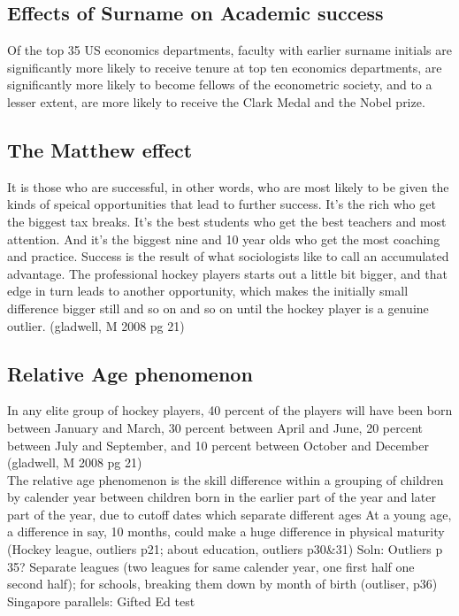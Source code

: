 \documentclass[11pt]{article}
\begin{document}
\subsection{Effects of Surname on Academic success}
Of the top 35 US economics departments, faculty with earlier surname initials are significantly more likely to receive tenure at top ten economics departments, are significantly more likely to become fellows of the econometric society, and to a lesser extent, are more likely to receive the Clark Medal and the Nobel prize.
\subsection{The Matthew effect}
It is those who are successful, in other words, who are most likely to be given the kinds of speical opportunities that lead to further success. It's the rich who get the biggest tax breaks. It's the best students who get the best teachers and most attention. And it's the biggest nine and 10 year olds who get the most coaching and practice. Success is the result of what sociologists like to call an accumulated advantage. The professional hockey players starts out a little bit bigger, and that edge in turn leads to another opportunity, which makes the initially small difference bigger still and so on and so on until the hockey player is a genuine outlier. (gladwell, M 2008 pg 21)

\subsection{Relative Age phenomenon}
In any elite group of hockey players, 40 percent of the players will have been born between January and March, 30 percent between April and June, 20 percent between July and September, and 10 percent between October and December (gladwell, M 2008 pg 21)
\\The relative age phenomenon is the skill difference within a grouping of children by calender year between children born in the earlier part of the year and later part of the year, due to cutoff dates which separate different ages
At a young age, a difference in say, 10 months, could make a huge difference in physical maturity (Hockey league, outliers p21; about education, outliers p30\&31)
Soln: Outliers p 35? Separate leagues (two leagues for same calender year, one first half one second half); for schools, breaking them down by month of birth (outliser, p36)
Singapore parallels: Gifted Ed test
\end{document}
